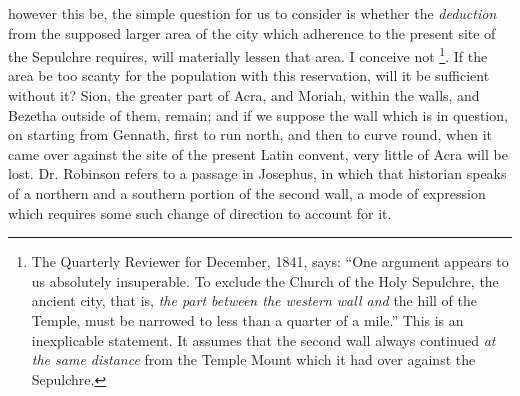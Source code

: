 however this be, the simple question for us to consider is
whether the \emph{deduction} from the supposed larger area of the city
which adherence to the present site of the Sepulchre requires, will
materially lessen that area. I conceive not \footnote{The Quarterly Reviewer for December, 1841, says: ``One argument appears
to us absolutely insuperable. To exclude the Church of the Holy
Sepulchre, the ancient city, that is, \emph{the part between the western
wall and} the hill of the Temple, must be narrowed to less than a
quarter of a mile.'' This is an inexplicable statement. It assumes that
the second wall always continued \emph{at the same distance} from the
Temple Mount which it had over against the Sepulchre.}. If the area be too scanty for the population with this
reservation, will it be sufficient without it? Sion, the greater part
of Acra, and Moriah, within the walls, and Bezetha outside of them,
remain; and if we suppose the wall which is in question, on starting
from Gennath, first to run north, and then to curve round, when it
came over against the site of the present Latin convent, very little
of Acra will be lost. Dr. Robinson refers to a passage in Josephus, in
which that historian speaks of a northern and a southern portion of
the second wall, a mode of expression which requires some such change
of direction to account for it.

